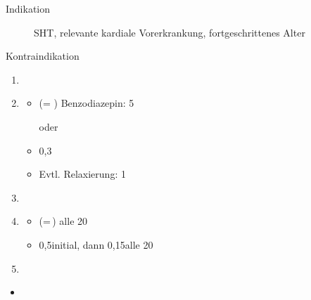{%
\begin{description}
  \item[Indikation] SHT,
  relevante kardiale Vorerkrankung, 
  fortgeschrittenes Alter
  \item[Kontraindikation] 
\end{description}
\begin{enumerate}
  \item {}
  \item {}
  \begin{itemize}
    \item {} \Mg* (= \Ml*)
    Benzodiazepin:  5\Mg* \par
    oder
     \Mg*
    \item {} 0,3\MgKg*
    \item Evtl. Relaxierung:  1\MgKg
  \end{itemize}
  \item {}
  \item {}
  \begin{itemize}
    \item 
     \Mg* 
    (=\,\Ml*) alle 20\Min*
    \item {} 0,5\MgKg* initial, 
    dann 0,15\MgKg* alle 20\Min*
  \end{itemize}
  \item {}
\end{enumerate}
}
{%
\begin{itemize}
  \item 
\end{itemize}
}


